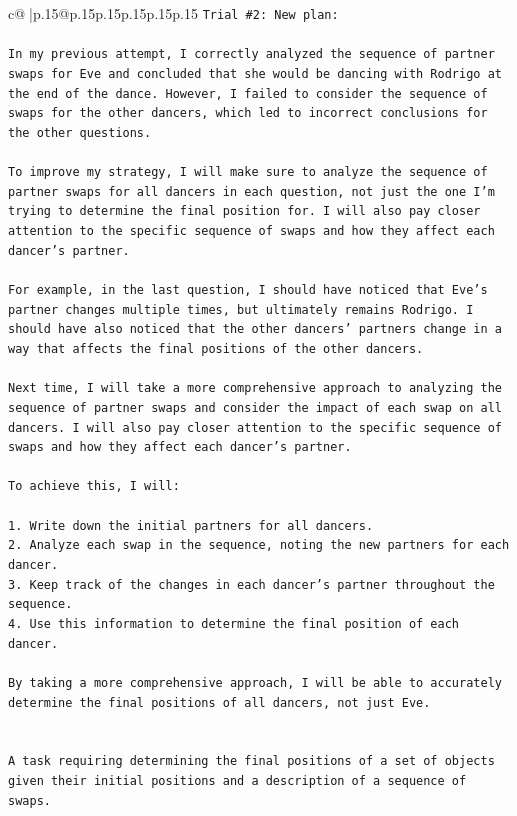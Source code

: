 \documentclass{article}
\begin{document}
{\begin{supertabular}{c@{$\;$}|p{.15\linewidth}@{}p{.15\linewidth}p{.15\linewidth}p{.15\linewidth}p{.15\linewidth}p{.15\linewidth}}
{{{\texttt{Trial \#2: New plan: } \\
\\ 
\texttt{In my previous attempt, I correctly analyzed the sequence of partner swaps for Eve and concluded that she would be dancing with Rodrigo at the end of the dance. However, I failed to consider the sequence of swaps for the other dancers, which led to incorrect conclusions for the other questions.} \\
\\ 
\texttt{To improve my strategy, I will make sure to analyze the sequence of partner swaps for all dancers in each question, not just the one I'm trying to determine the final position for. I will also pay closer attention to the specific sequence of swaps and how they affect each dancer's partner.} \\
\\ 
\texttt{For example, in the last question, I should have noticed that Eve's partner changes multiple times, but ultimately remains Rodrigo. I should have also noticed that the other dancers' partners change in a way that affects the final positions of the other dancers.} \\
\\ 
\texttt{Next time, I will take a more comprehensive approach to analyzing the sequence of partner swaps and consider the impact of each swap on all dancers. I will also pay closer attention to the specific sequence of swaps and how they affect each dancer's partner.} \\
\\ 
\texttt{To achieve this, I will:} \\
\\ 
\texttt{1. Write down the initial partners for all dancers.} \\
\texttt{2. Analyze each swap in the sequence, noting the new partners for each dancer.} \\
\texttt{3. Keep track of the changes in each dancer's partner throughout the sequence.} \\
\texttt{4. Use this information to determine the final position of each dancer.} \\
\\ 
\texttt{By taking a more comprehensive approach, I will be able to accurately determine the final positions of all dancers, not just Eve.} \\
\\ 
\\ 
\texttt{A task requiring determining the final positions of a set of objects given their initial positions and a description of a sequence of swaps.} \\
}}}
\end{supertabular}}
\end{document}
